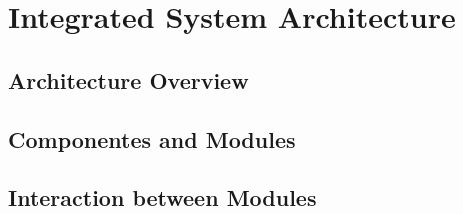 \chapter{Integrated System Architecture}

\section{Architecture Overview}


\section{Componentes and Modules}


\section{Interaction between Modules}

